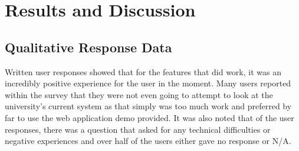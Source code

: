 \chapter{Results and Discussion}

\section{Qualitative Response Data}

Written user responses showed that for the features that did work, it was an incredibly positive experience for the user in the moment. Many users reported within the survey that they were not even going to attempt to look at the university’s current system as that simply was too much work and preferred by far to use the web application demo provided. It was also noted that of the user responses, there was a question that asked for any technical difficulties or negative experiences and over half of the users either gave no response or N/A.

